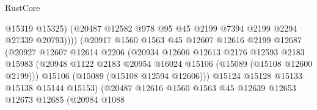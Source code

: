\begin{lexlean}{RustCore}
\begin{coremodule}
                                        @15319
                                        @15325)
                                      (@20487
                                        @12582
                                        @978
                                        @95
                                        @45
                                        @2199
                                        @7394
                                        @2199
                                        @2294
                                        @27339
                                        @20793))))
                                (@20917
                                  @1560
                                  @1563
                                  @45
                                  @12607
                                  @12616
                                  @2199
                                  @12687
                                  (@20927
                                    @12607
                                    @12614
                                    @2206
                                    (@20934
                                      @12606
                                      @12613
                                      @2176
                                      @12593
                                      @2183
                                      @15983
                                      (@20948
                                        @1122
                                        @2183
                                        @20954
                                        @16024
                                        @15106
                                        (@15089 (@15108 @12600 @2199)))
                                      @15106
                                      (@15089 (@15108 @12594 @12606)))
                                    @15124
                                    @15128
                                    @15133
                                    @15138
                                    @15144
                                    @15153)
                                  (@20487
                                    @12616
                                    @1560
                                    @1563
                                    @45
                                    @12639
                                    @12653
                                    @12673
                                    @12685
                                    (@20984
                                      @1088

\end{coremodule}
\end{lexlean}
